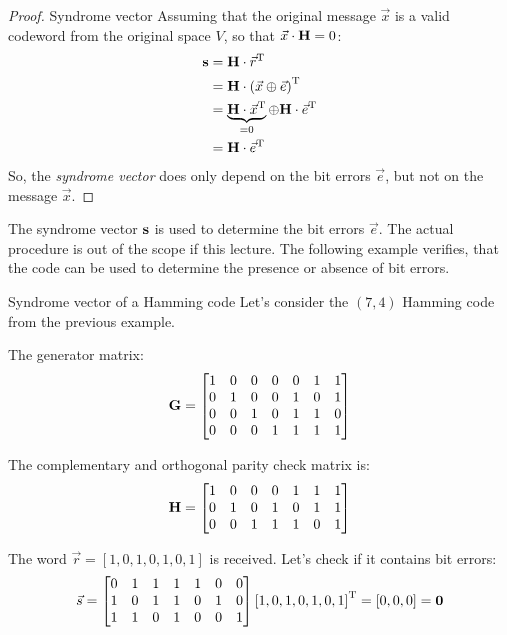 \begin{refsection}
\begin{proof}{Syndrome vector}
	Assuming that the original message $\vec{x}$ is a valid codeword from the original space $V$, so that $\vec{x} \cdot \bm{\mathrm{H}} = 0$:
	\begin{equation}
		\begin{split}
			\bm{\mathrm{s}} &= \bm{\mathrm{H}} \cdot \vec{r}^{\mathrm{T}} \\
			 &= \bm{\mathrm{H}} \cdot \left(\vec{x} \oplus \vec{e}\right)^{\mathrm{T}} \\
			 &= \underbrace{\bm{\mathrm{H}} \cdot \vec{x}^{\mathrm{T}}}_{= 0} \oplus \bm{\mathrm{H}} \cdot \vec{e}^{\mathrm{T}} \\
			 &= \bm{\mathrm{H}} \cdot \vec{e}^{\mathrm{T}}
		\end{split}
	\end{equation}
	So, the \emph{syndrome vector} does only depend on the bit errors $\vec{e}$, but not on the message $\vec{x}$.
\end{proof}

The syndrome vector $\bm{\mathrm{s}}$ is used to determine the bit errors $\vec{e}$. The actual procedure is out of the scope if this lecture. The following example verifies, that the code can be used to determine the presence or absence of bit errors.

\begin{example}{Syndrome vector of a Hamming code}
	Let's consider the $(7,4)$ Hamming code from the previous example.
	
	The generator matrix:
	\begin{equation}
		\bm{\mathrm{G}} = \left[\begin{matrix}
			1 & 0 & 0 & 0 & 0 & 1 & 1 \\
			0 & 1 & 0 & 0 & 1 & 0 & 1 \\
			0 & 0 & 1 & 0 & 1 & 1 & 0 \\
			0 & 0 & 0 & 1 & 1 & 1 & 1
		\end{matrix}\right]
	\end{equation}

	The complementary and orthogonal parity check matrix is:
	\begin{equation}
		\bm{\mathrm{H}} = \left[\begin{matrix}
			1 & 0 & 0 & 0 & 1 & 1 & 1 \\
			0 & 1 & 0 & 1 & 0 & 1 & 1 \\
			0 & 0 & 1 & 1 & 1 & 0 & 1
		\end{matrix}\right]
	\end{equation}

	The word $\vec{r} = \left[1, 0, 1, 0, 1, 0, 1\right]$ is received. Let's check if it contains bit errors:
	\begin{equation}
		\vec{s} = \left[\begin{matrix}
			0 & 1 & 1 & 1 & 1 & 0 & 0 \\
			1 & 0 & 1 & 1 & 0 & 1 & 0 \\
			1 & 1 & 0 & 1 & 0 & 0 & 1
		\end{matrix}\right] \left[1, 0, 1, 0, 1, 0, 1\right]^{\mathrm{T}} = \left[0, 0, 0\right] = \bm{\mathrm{\mathrm{0}}}
	\end{equation}
	

\end{example}
\end{refsection}
